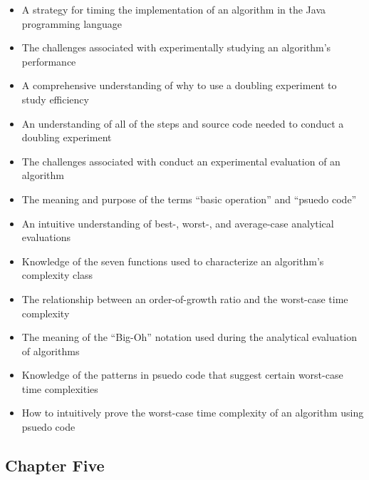 \documentclass[11pt]{article}
\begin{document}
\begin{itemize}

  \setlength{\itemsep}{0.05in}

  \item A strategy for timing the implementation of an algorithm in the Java
    programming language
  \item The challenges associated with experimentally studying an algorithm's
    performance
  \item A comprehensive understanding of why to use a doubling experiment to
    study efficiency
  \item An understanding of all of the steps and source code needed to conduct a
    doubling experiment
  \item The challenges associated with conduct an experimental evaluation of an
    algorithm
  \item The meaning and purpose of the terms ``basic operation'' and ``psuedo code''
  \item An intuitive understanding of best-, worst-, and average-case analytical
    evaluations
  \item Knowledge of the seven functions used to characterize an algorithm's
    complexity class
  \item The relationship between an order-of-growth ratio and the worst-case
    time complexity
  \item The meaning of the ``Big-Oh'' notation used during the
    analytical evaluation of algorithms
  \item Knowledge of the patterns in psuedo code that suggest certain
    worst-case time complexities
  \item How to intuitively prove the worst-case time complexity of an algorithm
    using psuedo code

\end{itemize}

\vspace*{-.2in}
\subsection*{Chapter Five}
\end{document}
